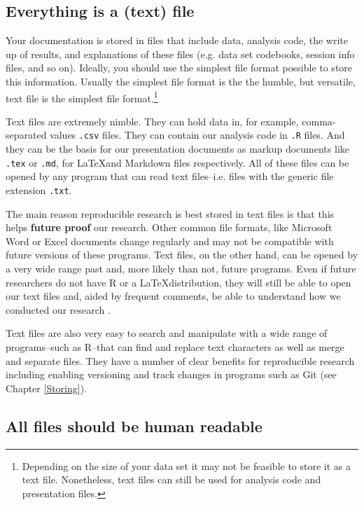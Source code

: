 \subsection{Everything is a (text) file}

Your documentation is stored in files that include data, analysis code, the write up of results, and explanations of these files (e.g. data set codebooks, session info files, and so on). Ideally, you should use the simplest file format possible to store this information. Usually the simplest file format is the the humble, but versatile, text file is the simplest file format.\footnote{Depending on the size of your data set it may not be feasible to store it as a text file. Nonetheless, text files can still be used for analysis code and presentation files.} 

Text files are extremely nimble. They can hold data in, for example, comma-separated values {\tt{.csv}}  files. They can contain our analysis code in {\tt{.R}} files. And they can be the basis for our presentation documents as markup documents like {\tt{.tex}} or {\tt{.md}}, for \LaTeX and Markdown files respectively. All of these files can be opened by any program that can read text files--i.e. files with the generic file extension {\tt{.txt}}. 

The main reason reproducible research is best stored in text files is that this helps {\bf{future proof}} our research. Other common file formats, like Microsoft Word  or Excel  documents change regularly and may not be compatible with future versions of these programs. Text files, on the other hand, can be opened by a very wide range past and, more likely than not, future programs. Even if future researchers do not have R or a \LaTeX distribution, they will still be able to open our text files and, aided by frequent comments, be able to understand how we conducted our research \cite[3]{Bowers2011}.

Text files are also very easy to search and manipulate with a wide range of programs--such as R--that can find and replace text characters as well as merge and separate files. They have a number of clear benefits for reproducible research including enabling versioning and track changes in programs such as Git (see Chapter \ref{Storing}).   

\subsection{All files should be human readable}

